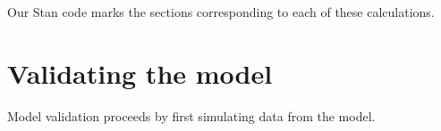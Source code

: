 \documentclass[reqno,12pt,a4paper]{amsart}
\begin{document}
Our Stan code marks the sections corresponding to each of these calculations.

\section{Validating the model}

Model validation proceeds by first simulating data from the model. 


%
%
\end{document}
